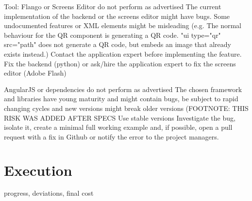 \begin{risk}
{Tool: Flango or Screens Editor do not perform as advertised}
{The current implementation of the backend or the screens editor might have bugs. Some undocumented features or \ac{XML} elements might be misleading (e.g. The normal behaviour for the QR component is generating a QR code. "ui type="qr" src="path" does not generate a QR code, but embeds an image that already exists instead.) }
{Contact the application expert before implementing the feature.}
{Fix the backend (python) or ask/hire the application expert to fix the screens editor (Adobe Flash)}
\end{risk}

\begin{risk}
{AngularJS or dependencies do not perform as advertised}
{The chosen framework and libraries have young maturity and might contain bugs, be subject to rapid changing cycles and new versions might break older versions (FOOTNOTE: THIS RISK WAS ADDED AFTER SPECS}
{Use stable versions}
{Investigate the bug, isolate it, create a minimal full working example and, if possible, open a pull request with a fix in Github or notify the error to the project managers.}
\end{risk}

\section{Execution}
progress, deviations, final cost
